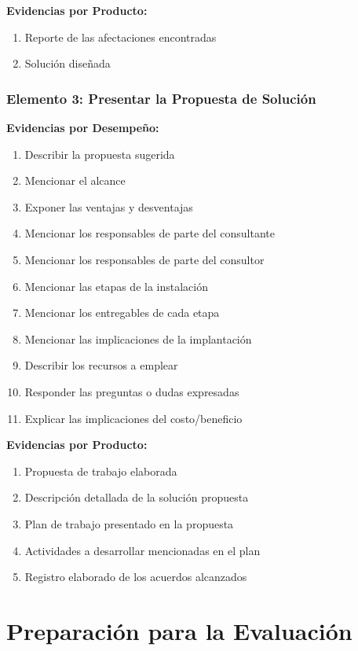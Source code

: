 \documentclass[12pt,letterpaper,oneside]{book}
\begin{document}
\textbf{Evidencias por Producto:}
\begin{enumerate}
\item Reporte de las afectaciones encontradas
\item Solución diseñada
\end{enumerate}

\subsubsection{Elemento 3: Presentar la Propuesta de Solución}

\textbf{Evidencias por Desempeño:}
\begin{enumerate}
\item Describir la propuesta sugerida
\item Mencionar el alcance
\item Exponer las ventajas y desventajas
\item Mencionar los responsables de parte del consultante
\item Mencionar los responsables de parte del consultor
\item Mencionar las etapas de la instalación
\item Mencionar los entregables de cada etapa
\item Mencionar las implicaciones de la implantación
\item Describir los recursos a emplear
\item Responder las preguntas o dudas expresadas
\item Explicar las implicaciones del costo/beneficio
\end{enumerate}

\textbf{Evidencias por Producto:}
\begin{enumerate}
\item Propuesta de trabajo elaborada
\item Descripción detallada de la solución propuesta
\item Plan de trabajo presentado en la propuesta
\item Actividades a desarrollar mencionadas en el plan
\item Registro elaborado de los acuerdos alcanzados
\end{enumerate}

\section{Preparación para la Evaluación}
\end{document}
